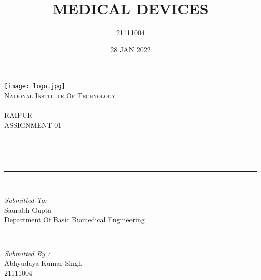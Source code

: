 \documentclass[12pt]{article}
\title{MEDICAL DEVICES}
\author{21111004}
\date{28 JAN 2022}
\makeatletter
\let\thetitle\@title
\makeatother
\begin{document}
\begin{titlepage}
	\centering
    \texttt{[image: logo.jpg]}\\[1.0 cm]	
    \textsc{\LARGE National Institute Of Technology \newline\\\\ RAIPUR}\\[2.0 CM]
    
	\textsc{\Large ASSIGNMENT 01}\\[0.5 cm]				%
	\rule{\linewidth}{0.4 mm} \\[0.4 cm]
	{ \huge \bfseries \thetitle}\\
	\rule{\linewidth}{0.4 mm} \\[1.5 cm]
	
	\begin{minipage}{0.6\textwidth}
		\begin{flushleft} \large
			\emph{Submitted To:}\\
			Saurabh Gupta\\
            Department Of Basic Biomedical Engineering\\
			\end{flushleft}
			\end{minipage}~
			\begin{minipage}{0.4\textwidth}
            
			\begin{flushright} \large
			\emph{Submitted By :}\\
			Abhyudaya Kumar Singh\\
            21111004\\
		\end{flushright}
        
	\end{minipage}\\[2 cm]
\end{titlepage}

\tableofcontents
\pagebreak
\end{document}
